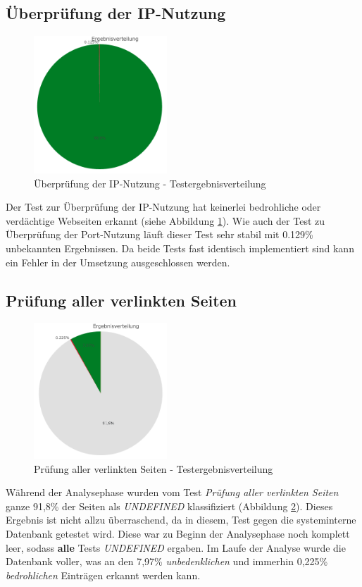 \subsection{Überprüfung der IP-Nutzung}

\begin{figure}[H]
  \centering
  \includegraphics[width=5cm]{images/stats/diaipscan}
  \caption{Überprüfung der IP-Nutzung - Testergebnisverteilung}
  \label{fig:analyse-diaipscan}
\end{figure}

Der Test zur Überprüfung der IP-Nutzung hat keinerlei bedrohliche oder verdächtige Webseiten erkannt (siehe Abbildung \ref{fig:analyse-diaipscan}). Wie auch der Test zu Überprüfung der Port-Nutzung läuft dieser Test sehr stabil mit 0.129\% unbekannten Ergebnissen. Da beide Tests fast identisch implementiert sind kann ein Fehler in der Umsetzung ausgeschlossen werden.

\subsection{Prüfung aller verlinkten Seiten}
\begin{figure}[H]
  \centering
  \includegraphics[width=5cm]{images/stats/dialinkchecker}
  \caption{Prüfung aller verlinkten Seiten - Testergebnisverteilung}
  \label{fig:analyse-dialinkchecker}
\end{figure}

Während der Analysephase wurden vom Test \textit{Prüfung aller verlinkten Seiten} ganze 91,8\% der
Seiten als \textit{UNDEFINED} klassifiziert (Abbildung \ref{fig:analyse-dialinkchecker}).
Dieses Ergebnis ist nicht allzu überraschend, da in diesem, Test gegen die systeminterne Datenbank getestet wird.
Diese war zu Beginn der Analysephase noch komplett leer, sodass \textbf{alle} Tests \textit{UNDEFINED} ergaben.
Im Laufe der Analyse wurde die Datenbank voller, was an den 7,97\% \textit{unbedenklichen} und immerhin
0,225\% \textit{bedrohlichen} Einträgen erkannt werden kann.


